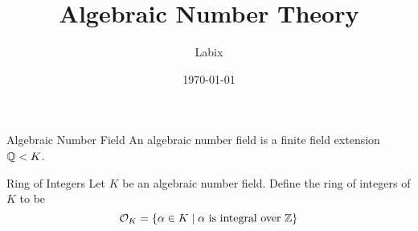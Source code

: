 \documentclass[a4paper]{article}
\title{Algebraic Number Theory}
\author{Labix}
\date{\today}
\begin{document}
\maketitle
\begin{abstract}
\end{abstract}
\tableofcontents
\pagebreak

\section{}
\begin{defn}{Algebraic Number Field}{} An algebraic number field is a finite field extension $\mathbb{Q}<K$. 
\end{defn}

\begin{defn}{Ring of Integers}{} Let $K$ be an algebraic number field. Define the ring of integers of $K$ to be $$\mathcal{O}_K=\{\alpha\in K\;|\;\alpha\text{ is integral over }\mathbb{Z}\}$$
\end{defn}
\end{document}
